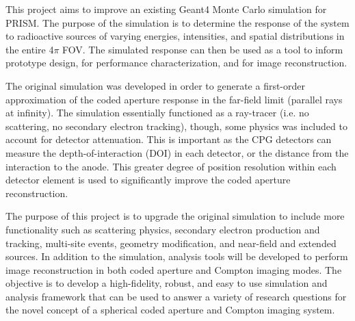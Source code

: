 \documentclass[10pt]{article}
\begin{document}


This project aims to improve an existing Geant4 \cite{Agostinelli2003} Monte Carlo simulation for PRISM. The purpose of the simulation is to determine the response of the system to radioactive sources of varying energies, intensities, and spatial distributions in the entire 4$\pi$ FOV. The simulated response can then be used as a tool to inform prototype design, for performance characterization, and for image reconstruction.

The original simulation was developed in order to generate a first-order approximation of the coded aperture response in the far-field limit (parallel rays at infinity). The simulation essentially functioned as a ray-tracer (i.e. no scattering, no secondary electron tracking), though, some physics was included to account for detector attenuation. This is important as the CPG detectors can measure the depth-of-interaction (DOI) in each detector, or the distance from the interaction to the anode. This greater degree of position resolution within each detector element is used to significantly improve the coded aperture reconstruction. 

The purpose of this project is to upgrade the original simulation to include more functionality such as scattering physics, secondary electron production and tracking, multi-site events, geometry modification, and near-field and extended sources. In addition to the simulation, analysis tools will be developed to perform image reconstruction in both coded aperture and Compton imaging modes. The objective is to develop a high-fidelity, robust, and easy to use simulation and analysis framework that can be used to answer a variety of research questions for the novel concept of a spherical coded aperture and Compton imaging system. 
\end{document}
